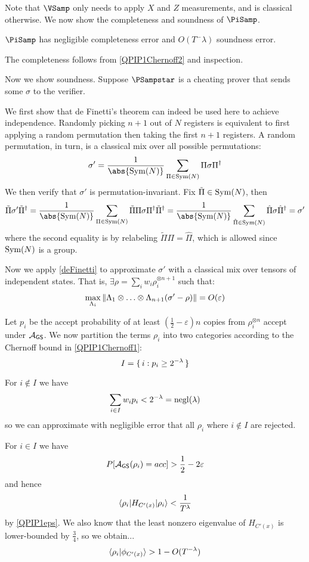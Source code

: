 Note that $\VSamp$ only needs to apply $X$ and $Z$ measurements, and is classical otherwise. We now show the completeness and soundness of $\PiSamp$.

\begin{thm}
    \label{QPIP1thm}
	$\PiSamp$ has negligible completeness error and $O(T^-\lambda)$ soundness error.
\end{thm}
\begin{prf}
	The completeness follows from \cref{QPIP1Chernoff2} and inspection.

	Now we show soundness.
	Suppose $\PSampstar$ is a cheating prover that sends some $\sigma$ to the verifier.

	We first show that de Finetti's theorem can indeed be used here to achieve independence.
	Randomly picking $n+1$ out of $N$ registers is equivalent to first applying a random permutation then taking the first $n+1$ registers.
	A random permutation, in turn, is a classical mix over all possible permutations:
	$$\sigma'=\frac{1}{\abs{\Sym(N)}}\sum_{\Pi\in\Sym(N)}\Pi\sigma\Pi^\dagger$$
	We then verify that $\sigma'$ is permutation-invariant.
	Fix $\tilde{\Pi}\in\operatorname{Sym}(N)$, then
	$$\tilde{\Pi}\sigma'\tilde{\Pi}^\dagger
	=\frac{1}{\abs{\Sym(N)}}\sum_{\Pi\in\Sym(N)}\tilde{\Pi}\Pi\sigma\Pi^\dagger\tilde{\Pi}^\dagger
	=\frac{1}{\abs{\Sym(N)}}\sum_{\hat{\Pi}\in\Sym(N)}\hat{\Pi}\sigma\hat{\Pi}^\dagger
	=\sigma'$$
	where the second equality is by relabeling $\tilde{\Pi}\Pi=\hat{\Pi}$, which is allowed since $\operatorname{Sym}(N)$ is a group.

	Now we apply \cref{deFinetti} to approximate $\sigma'$ with a classical mix over tensors of independent states.
	That is, $\exists\rho=\sum_i w_i\rho_i^{\otimes n+1}$ such that:
	$$\max_{\Lambda_i}\left\lVert\Lambda_1\otimes\ldots\otimes\Lambda_{n+1}(\sigma'-\rho)\right\rVert=O(\varepsilon)$$

	Let $p_i$ be the accept probability of at least $(\frac{1}{2}-\varepsilon)n$ copies from $\rho_i^{\otimes n}$ accept under $\mathcal{A}_{\mathsf{GS}}$.
	We now partition the terms $\rho_i$ into two categories according to the Chernoff bound in \cref{QPIP1Chernoff1}:
	$$I=\set{i:p_i\geq 2^{-\lambda}}$$

	For $i\notin I$ we have
	$$\sum_{i\in I} w_i p_i<2^{-\lambda}=\operatorname{negl}(\lambda)$$
	so we can approximate with negligible error that all $\rho_i$ where $i\notin I$ are rejected.

	For $i\in I$ we have
	$$P[\mathcal{A}_{\mathsf{GS}}(\rho_i)=acc]>\frac{1}{2}-2\varepsilon$$
	and hence
	$$\braket{\rho_i|H_{C'(x)}|\rho_i}<\frac{1}{T^\lambda}$$
	by \cref{QPIP1eps}.
	We also know that the least nonzero eigenvalue of $H_{C'(x)}$ is lower-bounded by $\frac{3}{4}$, so we obtain... 
	$$\braket{\rho_i|\phi_{C'(x)}}>1-O(T^{-\lambda})$$


\end{prf}
